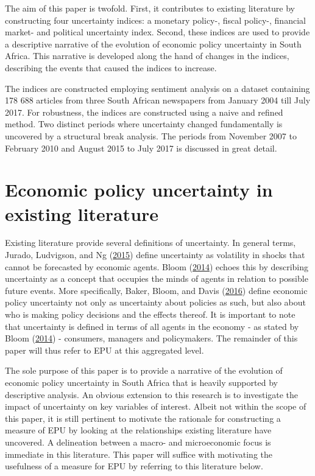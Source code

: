 \documentclass[11pt,preprint, authoryear]{elsarticle}
\numberwithin{equation}{section}
\numberwithin{figure}{section}
\numberwithin{table}{section}
\begin{document}
The aim of this paper is twofold. First, it contributes to existing literature by constructing four uncertainty indices: a monetary policy-, fiscal policy-, financial market- and political uncertainty index. Second, these indices are used to provide a descriptive narrative of the evolution of economic policy uncertainty in South Africa. This narrative is developed along the hand of changes in the indices, describing the events that caused the indices to increase. 

The indices are constructed employing sentiment analysis on a dataset
containing 178 688 articles from three South African newspapers from January 2004 till July 2017. For
robustness, the indices are constructed using a naive and refined method. Two distinct periods where uncertainty changed fundamentally is uncovered by a structural break analysis. The periods from November 2007 to February
2010 and August 2015 to July 2017 is discussed in great detail. 

\section{\texorpdfstring{Economic policy uncertainty in existing
literature
\label{sec_litreview}}{Economic policy uncertainty in existing literature }}\label{economic-policy-uncertainty-in-existing-literature}

Existing literature provide several definitions of uncertainty. In
general terms, Jurado, Ludvigson, and Ng
(\protect\hyperlink{ref-Jurado2015}{2015}) define uncertainty as
volatility in shocks that cannot be forecasted by economic agents. Bloom
(\protect\hyperlink{ref-Bloom2014}{2014}) echoes this by describing
uncertainty as a concept that occupies the minds of agents in relation
to possible future events. More specifically, Baker, Bloom, and Davis
(\protect\hyperlink{ref-Baker2016}{2016}) define economic policy
uncertainty not only as uncertainty about policies as such, but also
about who is making policy decisions and the effects thereof. It is
important to note that uncertainty is defined in terms of all agents in
the economy - as stated by Bloom
(\protect\hyperlink{ref-Bloom2014}{2014}) - consumers, managers and
policymakers. The remainder of this paper will thus refer to EPU at this
aggregated level.

The sole purpose of this paper is to provide a narrative of the
evolution of economic policy uncertainty in South Africa that is heavily
supported by descriptive analysis. An obvious extension to this research
is to investigate the impact of uncertainty on key variables of
interest. Albeit not within the scope of this paper, it is still
pertinent to motivate the rationale for constructing a measure of EPU by
looking at the relationships existing literature have uncovered. A
delineation between a macro- and microeconomic focus is immediate in
this literature. This paper will suffice with motivating the usefulness
of a measure for EPU by referring to this literature below.
\end{document}
